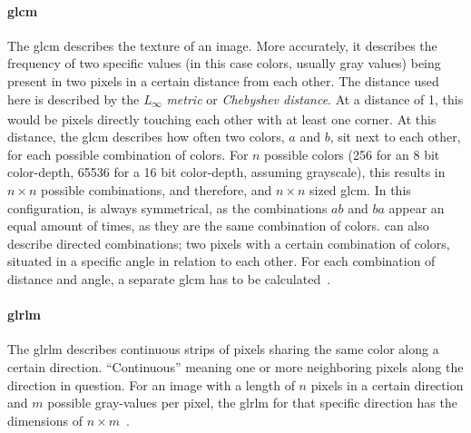 \paragraph{\acl{glcm}} The \ac{glcm} describes the texture of an image. More 
accurately, it describes the frequency of two specific values (in this case colors, usually gray values) being present in
two pixels in a certain distance from each other. The distance used here is described 
by the \textit{L\textsubscript{$\infty$} metric} or \textit{Chebyshev distance}. At a distance of 1, this would
be pixels directly touching each other with at least one corner. At this 
distance, the \ac{glcm} describes how often two colors, $a$ and $b$, sit
next to each other, for each possible combination of colors. For $n$ possible 
colors (256 for an 8 bit color-depth, 65536 for a 16 bit color-depth, assuming grayscale), this results in 
$n \times n$ possible combinations, and therefore, and $n \times n$ sized 
\ac{glcm}. In this configuration,  is always 
symmetrical, as the combinations $ab$ and $ba$ appear an equal amount of times,
as they are the same combination of colors. 
 can also describe directed combinations; two pixels with a certain 
combination of colors, situated in a specific angle in relation to each 
other. For each combination of distance and angle, a separate \ac{glcm} has to
be calculated~\cite{textural_features,py_rad_docs,texture_features}.


\paragraph{\acl{glrlm}} The \ac{glrlm} describes continuous strips of pixels 
sharing the same color along a certain direction. \enquote{Continuous} meaning 
one or more neighboring pixels along the direction in question. For an image
with a length of $n$ pixels in a certain 
direction and $m$ possible gray-values per pixel, the \ac{glrlm} for that specific direction has the dimensions of 
$n \times m$~\cite{py_rad_docs,textural_features}.

